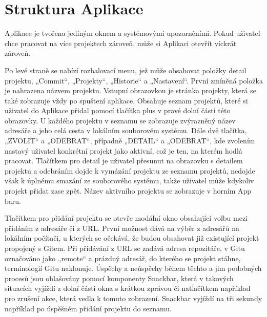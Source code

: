 \section{Struktura Aplikace}

Aplikace je tvořena jediným oknem a systémovými upozorněními. Pokud uživatel chce pracovat na více projektech zároveň, může si Aplikaci otevřít víckrát zároveň.

Po levé straně se nabízí rozbalovací menu, jež může obsahovat položky detail projektu, „Commit“, „Projekty“, „Historie“ a „Nastavení“. První zmíněná položka je nahrazena názvem projektu. Vstupní obrazovkou je stránka projekty, která se také zobrazuje vždy po spuštení aplikace. Obsahuje seznam projektů, které si uživatel do Aplikace přidal pomocí tlačítka plus v pravé dolní části této obrazovky. U každého projektu v seznamu se zobrazuje zvýrazněný název adresáře a jeho celá cesta v lokálním souborovém systému. Dále dvě tlačítka, „ZVOLIT“ a „ODEBRAT“, případně „DETAIL“ a „ODEBRAT“, kde zvolením nastavý uživatel konkrétní projekt jako aktivní, což je ten, na kterém hodlá pracovat. Tlačítkem pro detail je uživatel přesunut na obrazovku s detailem projektu a odebráním dojde k vymázání projektu ze seznamu projektů, nedojde však k úplnému smazání ze souborového systému, takže uživatel může kdykoliv projekt přidat zase zpět. Název aktivního projektu se zobrazuje v horním App baru.

Tlačítkem pro přidání projektu se otevře modální okno obsahující volbu mezi přidáním z adresáře či z URL. První možnost dává na výběr z adresářů na lokálním počítači, u kterých se očekává, že budou obsahovat již existující projekt propojený s Gitem. Při přidávání z URL se zadává adresa repozitáře, v Gitu označováno jako „remote“ a prázdný adresář, do kterého se projekt stáhne, terminologií Gitu naklonuje. Úspěchy a neúspěchy během těchto a jim podobných procesů jsou ohlašovány pomocí komponenty Snackbar, která v takových situacích vyjíždí z dolní části okna s krátkou zprávou či natlačítkem například pro zrušení akce, která vedla k tomuto zobrazení. Snackbar vyjíždí na tři sekundy například po úspěšném přidání projektu do seznamu.

